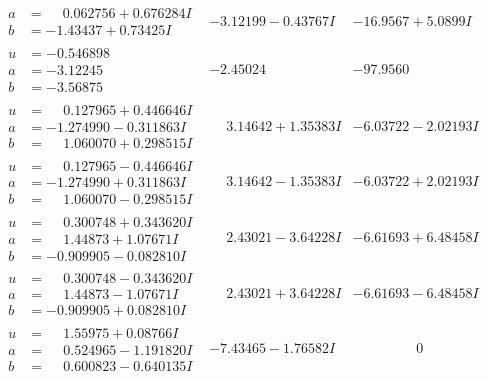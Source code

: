 \documentclass[1p]{elsarticle_modified}
\theoremstyle{definition}
\begin{document}
$$\begin{array}{c|c|c}
\begin{aligned}
a &= \phantom{-}0.062756 + 0.676284 I \\
b &= -1.43437 + 0.73425 I\end{aligned}
 & -3.12199 - 0.43767 I & -16.9567 + 5.0899 I \\ \hline\begin{aligned}
u &= -0.546898\phantom{ +0.000000I} \\
a &= -3.12245\phantom{ +0.000000I} \\
b &= -3.56875\phantom{ +0.000000I}\end{aligned}
 & -2.45024\phantom{ +0.000000I} & -97.9560\phantom{ +0.000000I} \\ \hline\begin{aligned}
u &= \phantom{-}0.127965 + 0.446646 I \\
a &= -1.274990 - 0.311863 I \\
b &= \phantom{-}1.060070 + 0.298515 I\end{aligned}
 & \phantom{-}3.14642 + 1.35383 I & -6.03722 - 2.02193 I \\ \hline\begin{aligned}
u &= \phantom{-}0.127965 - 0.446646 I \\
a &= -1.274990 + 0.311863 I \\
b &= \phantom{-}1.060070 - 0.298515 I\end{aligned}
 & \phantom{-}3.14642 - 1.35383 I & -6.03722 + 2.02193 I \\ \hline\begin{aligned}
u &= \phantom{-}0.300748 + 0.343620 I \\
a &= \phantom{-}1.44873 + 1.07671 I \\
b &= -0.909905 - 0.082810 I\end{aligned}
 & \phantom{-}2.43021 - 3.64228 I & -6.61693 + 6.48458 I \\ \hline\begin{aligned}
u &= \phantom{-}0.300748 - 0.343620 I \\
a &= \phantom{-}1.44873 - 1.07671 I \\
b &= -0.909905 + 0.082810 I\end{aligned}
 & \phantom{-}2.43021 + 3.64228 I & -6.61693 - 6.48458 I \\ \hline\begin{aligned}
u &= \phantom{-}1.55975 + 0.08766 I \\
a &= \phantom{-}0.524965 - 1.191820 I \\
b &= \phantom{-}0.600823 - 0.640135 I\end{aligned}
 & -7.43465 - 1.76582 I & \phantom{-0.000000 } 0 \\ \hline\begin{aligned}

\end{aligned}
\end{array}$$
\end{document}
